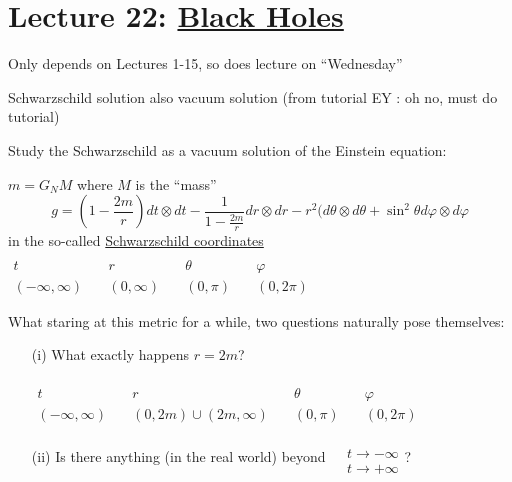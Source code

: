 \documentclass[10pt]{amsart}
\begin{document}
\begin{multicols*}{2}
	\section{}
	
	\section{}
	
	\section{}
	
	\section{Lecture 22: \underline{Black Holes}}
	
	Only depends on Lectures 1-15, so does lecture on ``Wednesday''
	
	Schwarzschild solution also vacuum solution (from tutorial EY : oh no, must do tutorial)
	
	Study the Schwarzschild as a vacuum solution of the Einstein equation:
	
	$m = G_N M$ where $M$ is the ``mass''
	\[
	g = \left( 1 - \frac{2m}{r} \right) dt \otimes dt - \frac{1}{ 1 - \frac{2m}{r} } dr \otimes dr - r^2 ( d\theta \otimes d\theta + \sin^2{\theta} d\varphi \otimes d\varphi
	\]
	in the so-called \underline{Schwarzschild coordinates}  $\begin{aligned} & & & & \quad \\
	t \quad & r \quad & \theta \quad & \varphi \\ 
	(-\infty,\infty) \quad & (0,\infty) \quad & (0,\pi) \quad & (0,2\pi) \end{aligned}$
	
	What staring at this metric for a while, two questions naturally pose themselves:
	
	\begin{enumerate}
		\item[(i)] What exactly happens \@ $r= 2m$?
		
		$\begin{aligned} & & & & \quad \\
		t \quad & r \quad & \theta \quad & \varphi \\ 
		(-\infty,\infty) \quad & (0,2m) \cup ( 2m, \infty) \quad & (0,\pi) \quad & (0,2\pi) \end{aligned}$
		
		
		\item[(ii)] Is there anything (in the real world) beyond $\begin{aligned} & \quad \\
		& t \to -\infty \\
		& t\to +\infty \end{aligned}$?
		

\end{enumerate}
\end{multicols*}
\end{document}
